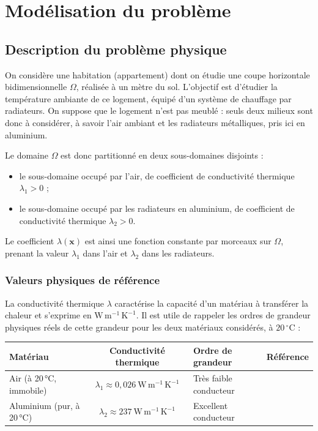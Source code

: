 \documentclass[12pt,a4paper]{article}
\begin{document}
	\section{Modélisation du problème}
	\label{sec:modelisation}
	
	\subsection{Description du problème physique}
	On considère une habitation (appartement) dont on étudie une coupe horizontale bidimensionnelle $\Omega$, réalisée à un mètre du sol. L'objectif est d'étudier la température ambiante de ce logement, équipé d'un système de chauffage par radiateurs. On suppose que le logement n'est pas meublé : seuls deux milieux sont donc à considérer, à savoir l'air ambiant et les radiateurs métalliques, pris ici en aluminium.
	
	Le domaine $\Omega$ est donc partitionné en deux sous-domaines disjoints :
	\begin{itemize}
		\item le sous-domaine occupé par l'air, de coefficient de conductivité thermique $\lambda_1 > 0$ ;
		\item le sous-domaine occupé par les radiateurs en aluminium, de coefficient de conductivité thermique $\lambda_2 > 0$.
	\end{itemize}
	Le coefficient $\lambda(\mathbf{x})$ est ainsi une fonction constante par morceaux sur $\Omega$, prenant la valeur $\lambda_1$ dans l'air et $\lambda_2$ dans les radiateurs.
	
	\subsubsection*{Valeurs physiques de référence}
	
	La conductivité thermique $\lambda$ caractérise la capacité d'un matériau à transférer la chaleur et s'exprime en $\mathrm{W\,m^{-1}\,K^{-1}}$. Il est utile de rappeler les ordres de grandeur physiques réels de cette grandeur pour les deux matériaux considérés, à $20\,^\circ\mathrm{C}$ :
	
	\begin{center}
		\small
		\setlength{\tabcolsep}{3pt}
		\begin{tabular}{|l|c|l|c|}
			\hline
			\textbf{Matériau} & \textbf{Conductivité thermique}
			& \textbf{Ordre de grandeur} & \textbf{Référence} \\
			\hline
			Air (à 20\,°C, immobile)
			& $\lambda_1 \approx 0{,}026~\mathrm{W\,m^{-1}\,K^{-1}}$
			& Très faible conducteur
			& \cite{engtoolbox-air,incropera} \\
			\hline
			Aluminium (pur, à 20\,°C)
			& $\lambda_2 \approx 237~\mathrm{W\,m^{-1}\,K^{-1}}$
			& Excellent conducteur
			& \cite{engtoolbox-alu,incropera} \\
			\hline
		\end{tabular}
	\end{center}
	
\end{document}
